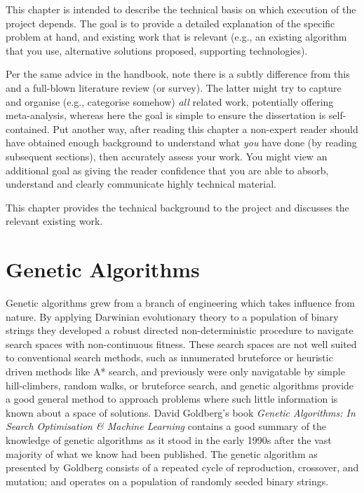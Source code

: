 {
	\color{red}
\noindent
This chapter is intended to describe the technical basis on which execution
of the project depends.  The goal is to provide a detailed explanation of
the specific problem at hand, and existing work that is relevant (e.g., an
existing algorithm that you use, alternative solutions proposed, supporting
technologies).

Per the same advice in the handbook, note there is a subtly difference from
this and a full-blown literature review (or survey).  The latter might try
to capture and organise (e.g., categorise somehow) {\em all} related work,
potentially offering meta-analysis, whereas here the goal is simple to
ensure the dissertation is self-contained.  Put another way, after reading
this chapter a non-expert reader should have obtained enough background to
understand what {\em you} have done (by reading subsequent sections), then
accurately assess your work.  You might view an additional goal as giving
the reader confidence that you are able to absorb, understand and clearly
communicate highly technical material.
}

This chapter provides the technical background to the project and discusses
the relevant existing work.

\section{Genetic Algorithms}
Genetic algorithms grew from a branch of engineering which takes influence from
nature. By applying Darwinian evolutionary theory to a population of binary strings
they developed
a robust directed non-deterministic procedure to navigate search spaces with non-continuous
fitness. These search spaces are not well suited to conventional search methods,
such as innumerated bruteforce or heuristic driven methods like A* search,
and previously were only navigatable by simple hill-climbers, random walks, or bruteforce search,
and genetic algorithms provide a good general method to approach problems where
such little information is known about a space of solutions.
David Goldberg's book {\em Genetic Algorithms: In Search Optimisation \& Machine
Learning} \cite{Goldberg:1989:GAS:534133} contains a good summary of the knowledge
of genetic algorithms as it stood in the early 1990s after the vast majority of what
we know had been published.
The genetic algorithm as presented by Goldberg consists
of a repeated cycle of reproduction, crossover, and mutation; and operates on a
population of randomly seeded binary strings.

